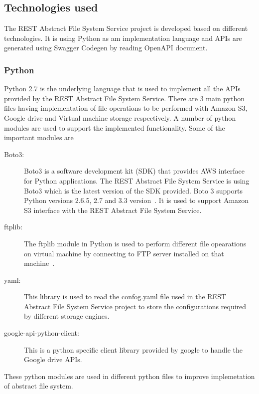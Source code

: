 \subsection{Technologies used}

The REST Abstract File System Service project is developed based on
different technologies. It is using Python as am implementation
language and APIs are generated using Swagger Codegen by reading
OpenAPI document.

\subsubsection{Python}

Python 2.7 is the underlying language that is used to implement all
the APIs provided by the REST Abstract File System Service.  There are
3 main python files having implementation of file operations to be
performed with Amazon S3, Google drive and Virtual machine storage
respectively. A number of python modules are used to support the
implemented functionality. Some of the important modules are

\begin{description}

\item[Boto3:] Boto3 is a software development kit (SDK) that provides
  AWS interface for Python applications. The REST Abstract File System
  Service is using Boto3 which is the latest version of the SDK
  provided. Boto 3 supports Python versions 2.6.5, 2.7 and 3.3
  version~\cite{hid-sp18-420-boto}.  It is used to support Amazon S3
  interface with the REST Abstract File System Service.

\item[ftplib:] The ftplib module in Python is used to perform
  different file opearations on virtual machine by connecting to FTP
  server installed on that machine~\cite{hid-sp18-420-FTP}.

\item[yaml:] This library is used to read the confog.yaml file used in
  the REST Abstract File System Service project to store the
  configurations required by different storage engines.

\item[google-api-python-client:] This is a python specific client
  library provided by google to handle the Google drive APIs.

\end{description}

These python modules are used in different python files to improve 
implemetation of abstract file system.

